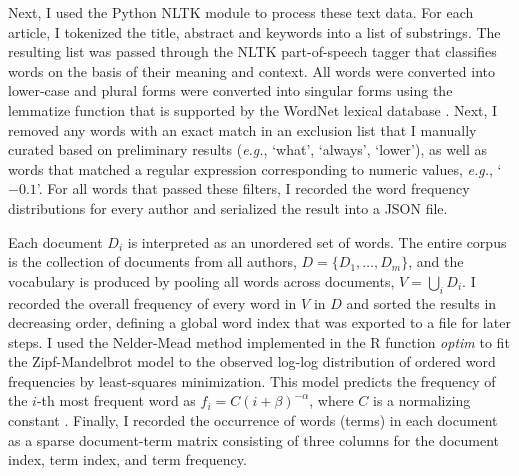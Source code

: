\documentclass[12pt]{article}
\begin{document}
Next, I used the Python NLTK \citep[Natural Language ToolKit;][]{bird2009natural} module to process these text data.
For each article, I tokenized the title, abstract and keywords into a list of substrings.
The resulting list was passed through the NLTK part-of-speech tagger that classifies words on the basis of their meaning and context.
All words were converted into lower-case and plural forms were converted into singular forms using the lemmatize function that is supported by the WordNet lexical database \citep{fellbaum2010wordnet}.
Next, I removed any words with an exact match in an exclusion list that I manually curated based on preliminary results (\textit{e.g.}, `what',  `always', `lower'), as well as words that matched a regular expression %
corresponding to numeric values, \textit{e.g.}, `$-0.1$'.
For all words that passed these filters, I recorded the word frequency distributions for every author and serialized the result into a JSON file.


Each document $D_i$ is interpreted as an unordered set of words.
The entire corpus is the collection of documents from all authors, $D=\{D_1, \ldots, D_m\}$, and the vocabulary is produced by pooling all words across documents, $V=\bigcup_i D_i$.
I recorded the overall frequency of every word in $V$ in $D$ and sorted the results in decreasing order, defining a global word index that was exported to a file for later steps.
I used the Nelder-Mead method implemented in the R function \textit{optim} to fit the Zipf-Mandelbrot model to the observed log-log distribution of ordered word frequencies by least-squares minimization.
This model predicts the frequency of the $i$-th most frequent word as $f_i = C (i+\beta)^{-\alpha}$, where $C$ is a normalizing constant \citep{piantadosi2014zipf}.
Finally, I recorded the occurrence of words (terms) in each document as a sparse document-term matrix consisting of three columns for the document index, term index, and term frequency.




\end{document}
